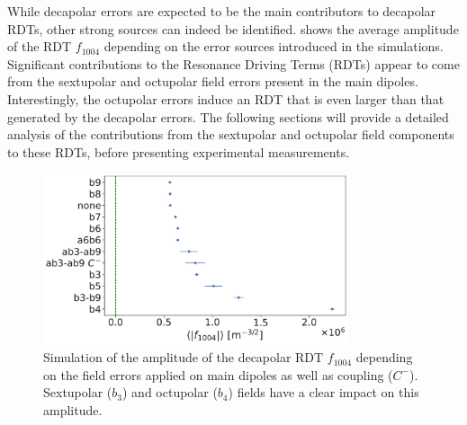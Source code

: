 While decapolar errors are expected to be the main contributors to decapolar RDTs, other strong
sources can indeed be identified.  shows the average
amplitude of the RDT $f_{1004}$ depending on the error sources introduced in the simulations. 
Significant contributions to the Resonance Driving Terms (RDTs) appear to come from the sextupolar
and octupolar field errors present in the main dipoles. Interestingly, the octupolar errors induce
an RDT that is even larger than that generated by the decapolar errors. 
The following sections will provide a detailed analysis of the contributions from the sextupolar and
octupolar field components to these RDTs, before presenting experimental measurements.

\begin{figure}[!htb]
    \centering
    \includegraphics[width=0.8\textwidth]{./images/f1004/f1004_several_factors.pdf}
    \caption{Simulation of the amplitude of the decapolar RDT $f_{1004}$ depending on the field
             errors applied on main dipoles as well as coupling ($C^-$). Sextupolar ($b_3$) and
             octupolar ($b_4$) fields have a clear impact on this amplitude.}
    \label{fig:decapoles:rdts:contributions}
\end{figure}


%
%


